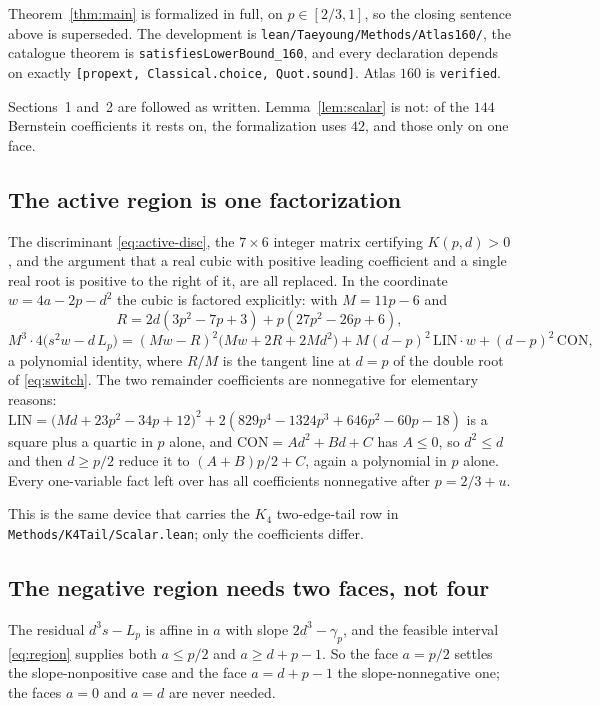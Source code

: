 \documentclass[11pt]{article}
\begin{document}
Theorem~\ref{thm:main} is formalized in full, on $p\in[2/3,1]$, so the closing
sentence above is superseded.  The development is
\texttt{lean/Taeyoung/Methods/Atlas160/}, the catalogue theorem is
\texttt{satisfiesLowerBound\_160}, and every declaration depends on exactly
\texttt{[propext, Classical.choice, Quot.sound]}.  Atlas $160$ is
\texttt{verified}.

Sections~1 and~2 are followed as written.  Lemma~\ref{lem:scalar} is not: of
the $144$ Bernstein coefficients it rests on, the formalization uses $42$, and
those only on one face.

\subsection{The active region is one factorization}

The discriminant \eqref{eq:active-disc}, the $7\times6$ integer matrix
certifying $K(p,d)>0$, and the argument that a real cubic with positive leading
coefficient and a single real root is positive to the right of it, are all
replaced.  In the coordinate $w=4a-2p-d^{2}$ the cubic is factored explicitly:
with $M=11p-6$ and
\[
 R=2d(3p^{2}-7p+3)+p(27p^{2}-26p+6),
\]
\[
 M^{3}\cdot4\bigl(s^{2}w-d\,L_p\bigr)
 =(Mw-R)^{2}\bigl(Mw+2R+2Md^{2}\bigr)
 +M(d-p)^{2}\,\mathrm{LIN}\cdot w
 +(d-p)^{2}\,\mathrm{CON},
\]
a polynomial identity, where $R/M$ is the tangent line at $d=p$ of the double
root of \eqref{eq:switch}.  The two remainder coefficients are nonnegative for
elementary reasons: $\mathrm{LIN}=\bigl(Md+23p^{2}-34p+12\bigr)^{2}
+2(829p^{4}-1324p^{3}+646p^{2}-60p-18)$ is a square plus a quartic in $p$
alone, and $\mathrm{CON}=Ad^{2}+Bd+C$ has $A\leq0$, so $d^{2}\leq d$ and then
$d\geq p/2$ reduce it to $(A+B)p/2+C$, again a polynomial in $p$ alone.  Every
one-variable fact left over has all coefficients nonnegative after
$p=2/3+u$.

This is the same device that carries the $K_4$ two-edge-tail row in
\texttt{Methods/K4Tail/Scalar.lean}; only the coefficients differ.

\subsection{The negative region needs two faces, not four}

The residual $d^{3}s-L_p$ is affine in $a$ with slope $2d^{3}-\gamma_p$, and the
feasible interval \eqref{eq:region} supplies both $a\leq p/2$ and
$a\geq d+p-1$.  So the face $a=p/2$ settles the slope-nonpositive case and the
face $a=d+p-1$ the slope-nonnegative one; the faces $a=0$ and $a=d$ are never
needed.
\end{document}
